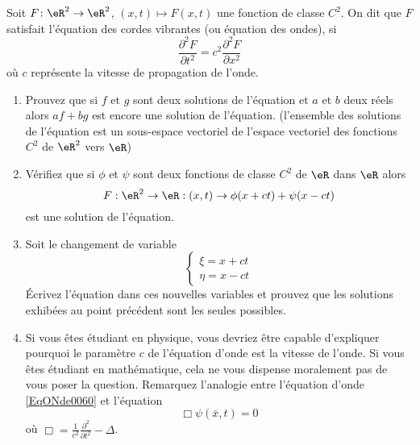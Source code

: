 
\begin{exercice}\label{exo0060}

Soit $F\colon \eR^2\to \eR^2$,  $(x,t) \mapsto F(x,t)$ une fonction de classe $C^2$. On dit que $F$ satisfait l'équation des cordes vibrantes (ou équation des ondes), si 
\begin{equation}		\label{EqONde0060}
	\frac{\partial^2 F}{\partial t^2 } = c^2 \frac{\partial^2 F}{\partial x^2}
\end{equation}
 où $c$ représente la vitesse de propagation de l'onde.

\begin{enumerate}
\item
Prouvez que si $f$ et $g$ sont deux solutions de l'équation et $a$ et $b$ deux réels alors $af+bg$ est encore une solution de l'équation.  (l'ensemble des solutions de l'équation est un sous-espace vectoriel de l'espace vectoriel des fonctions $C^2$ de $\eR^2$ vers $\eR$)
\item

Vérifiez que si $\phi$ et $\psi$ sont deux fonctions de classe $C^2$ de
$\eR$ dans $\eR$ alors
\[
F: \eR^2 \rightarrow \eR: (x,t) \rightarrow \phi(x+ct) + \psi(x-ct)
\]
est une solution de l'équation.
\item
Soit le changement de variable
\[
\left\{ \begin{array}{l} \xi = x + c t \\ \eta = x-ct \end{array} \right.
\]
Écrivez l'équation dans ces nouvelles variables et prouvez que les solutions exhibées au point précédent sont les seules possibles.

\item
Si vous êtes étudiant en physique, vous devriez être capable d'expliquer pourquoi le paramètre $c$ de l'équation d'onde est la vitesse de l'onde. Si vous êtes étudiant en mathématique, cela ne vous dispense moralement pas de vous poser la question. Remarquez l'analogie entre l'équation d'onde \eqref{EqONde0060} et l'équation 
\begin{equation}
	\Box \psi(\bar x,t)=0
\end{equation}
où $\Box =\frac{1}{ c^2 }\frac{ \partial^2 }{ \partial t^2 }-\Delta$. 
\end{enumerate}


\end{exercice}
